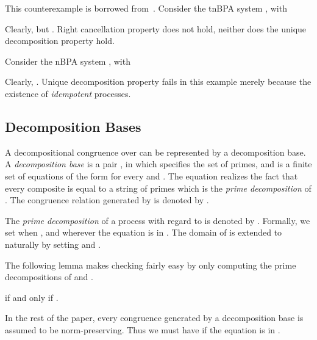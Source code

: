 \documentclass{llncs}
\begin{document}
\begin{example}\label{example:weak_bisimilarity_decom}
This counterexample is borrowed from~\cite{DBLP:conf/cav/Huttel91}. Consider the tnBPA system , with

Clearly,  but . Right cancellation property does not hold, neither does the unique decomposition property hold.
\end{example}

\begin{example}
Consider the nBPA system , with

Clearly, .  Unique decomposition property fails in this example merely because the existence of {\em idempotent} processes.
\end{example}


\subsection{Decomposition Bases}\label{subset:decomposition_base}

A decompositional congruence over  can be represented by a decomposition base.  A {\em decomposition base}  is a pair , in which  specifies the set of primes, and  is a finite set of equations of the form  for every  and .  The equation  realizes the fact that every composite  is equal to a string of primes  which is the {\em prime decomposition} of .  The congruence relation generated by  is denoted by .



The {\em prime decomposition} of a process  with regard to  is denoted by .
Formally, we set  when , and  wherever the equation  is in .
The domain of  is extended to  naturally by setting  and  .

The following lemma makes checking  fairly easy by only computing the prime decompositions of  and .



\begin{lemma}\label{lem:dcmp}
 if and only if .
\end{lemma}

In the rest of the paper, every congruence  generated by a decomposition base  is assumed to be norm-preserving.  Thus we must have  if the equation  is in .
\end{document}
